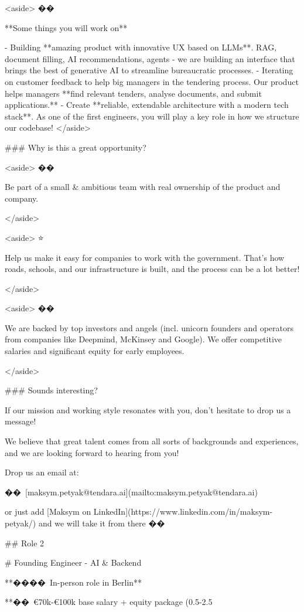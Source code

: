 <aside>
��️

**Some things you will work on**

- Building **amazing product with innovative UX based on LLMs**. RAG, document filling, AI recommendations, agents - we are building an interface that brings the best of generative AI to streamline bureaucratic processes.
- Iterating on customer feedback to help big managers in the tendering process. Our product helps managers **find relevant tenders, analyse documents, and submit applications.**
- Create **reliable, extendable architecture with a modern tech stack**. As one of the first engineers, you will play a key role in how we structure our codebase!
</aside>

### Why is this a great opportunity?

<aside>
��

Be part of a small & ambitious team with real ownership of the product and company.

</aside>

<aside>
⭐

Help us make it easy for companies to work with the government. That’s how roads, schools, and our infrastructure is built, and the process can be a lot better!

</aside>

<aside>
��

We are backed by top investors and angels (incl. unicorn founders and operators from companies like Deepmind, McKinsey and Google). We offer competitive salaries and significant equity for early employees.

</aside>

### Sounds interesting?

If our mission and working style resonates with you, don’t hesitate to drop us a message!

We believe that great talent comes from all sorts of backgrounds and experiences, and we are looking forward to hearing from you!

Drop us an email at:

�� [maksym.petyak@tendara.ai](mailto:maksym.petyak@tendara.ai) 

or just add [Maksym on LinkedIn](https://www.linkedin.com/in/maksym-petyak/) and we will take it from there ��


## Role 2

# Founding Engineer - AI & Backend

**���� In-person role in Berlin**

**�� €70k-€100k base salary + equity package (0.5-2.5%

